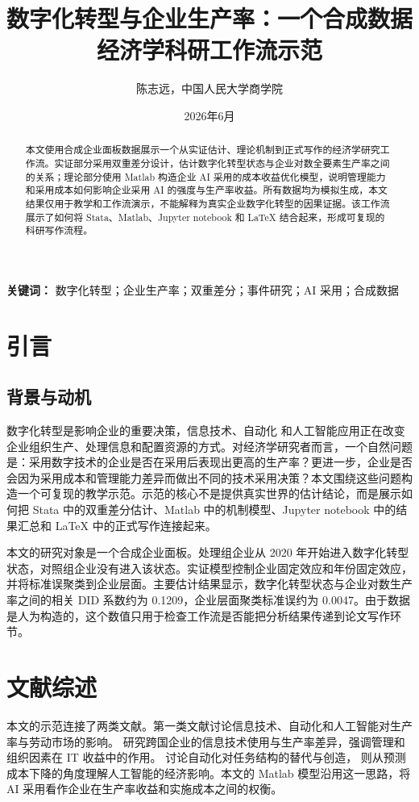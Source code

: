 \documentclass[11pt]{ctexart}
\title{数字化转型与企业生产率：一个合成数据经济学科研工作流示范}
\author{陈志远，中国人民大学商学院}
\date{2026年6月}
\begin{document}
\maketitle

\begin{abstract}
本文使用合成企业面板数据展示一个从实证估计、理论机制到正式写作的经济学研究工作流。实证部分采用双重差分设计，估计数字化转型状态与企业对数全要素生产率之间的关系；理论部分使用 Matlab 构造企业 AI 采用的成本收益优化模型，说明管理能力和采用成本如何影响企业采用 AI 的强度与生产率收益。所有数据均为模拟生成，本文结果仅用于教学和工作流演示，不能解释为真实企业数字化转型的因果证据。该工作流展示了如何将 Stata、Matlab、Jupyter notebook 和 \LaTeX{} 结合起来，形成可复现的科研写作流程。


\end{abstract}

\noindent\textbf{关键词：} 数字化转型；企业生产率；双重差分；事件研究；AI 采用；合成数据

\section{引言}
\subsection{背景与动机}

数字化转型是影响企业的重要决策，信息技术、自动化
和人工智能应用正在改变企业组织生产、处理信息和配置资源的方式。对经济学研究者而言，一个自然问题是：采用数字技术的企业是否在采用后表现出更高的生产率？更进一步，企业是否会因为采用成本和管理能力差异而做出不同的技术采用决策？本文围绕这些问题构造一个可复现的教学示范。示范的核心不是提供真实世界的估计结论，而是展示如何把 Stata 中的双重差分估计、Matlab 中的机制模型、Jupyter notebook 中的结果汇总和 \LaTeX{} 中的正式写作连接起来。

本文的研究对象是一个合成企业面板。处理组企业从 2020 年开始进入数字化转型状态，对照组企业没有进入该状态。实证模型控制企业固定效应和年份固定效应，并将标准误聚类到企业层面。主要估计结果显示，数字化转型状态与企业对数生产率之间的相关 DID 系数约为 0.1209，企业层面聚类标准误约为 0.0047。由于数据是人为构造的，这个数值只用于检查工作流是否能把分析结果传递到论文写作环节。



\section{文献综述}

本文的示范连接了两类文献。第一类文献讨论信息技术、自动化和人工智能对生产率与劳动市场的影响。\citet{BloomSadunVanReenen2012} 研究跨国企业的信息技术使用与生产率差异，强调管理和组织因素在 IT 收益中的作用。\citet{AcemogluRestrepo2019} 讨论自动化对任务结构的替代与创造，\citet{AgrawalGansGoldfarb2019} 则从预测成本下降的角度理解人工智能的经济影响。本文的 Matlab 模型沿用这一思路，将 AI 采用看作企业在生产率收益和实施成本之间的权衡。
\end{document}
